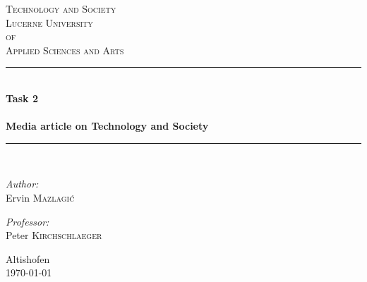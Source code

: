 \begin{titlepage}

\begin{center}

\textsc{\LARGE Technology and Society}\\[1.5cm]

\textsc{\Large Lucerne University\\ of\\ Applied Sciences and Arts}\\[0.5cm]

\vfill{}

\newcommand{\HRule}{\rule{\linewidth}{0.5mm}}
\HRule \\[0.4cm]
{   \Huge \bfseries Task 2\\
        ~\\
	\large Media article on Technology and Society}\\[0.4cm]

\HRule \\[1.5cm]

\begin{minipage}{0.4\textwidth}
    \begin{flushleft} \large
        \emph{Author:}\\
        Ervin \textsc{Mazlagi\'c}\\
    \end{flushleft}
\end{minipage}
\hfill
\begin{minipage}{0.4\textwidth}
    \begin{flushright} \large
        \emph{Professor:} \\
        Peter \textsc{Kirchschlaeger} \\
    \end{flushright}
\end{minipage}

\vfill{}
\vfill{}
\vfill{}

{\large Altishofen\\ \today}

\end{center}

\end{titlepage}
